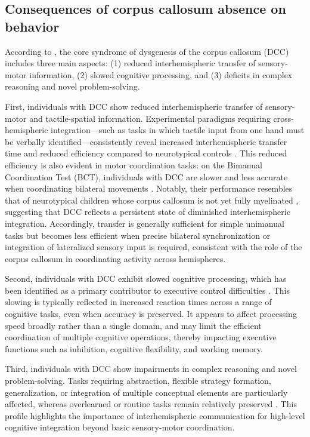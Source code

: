 \documentclass{article}
\begin{document}
\subsection{Consequences of corpus callosum absence on behavior}

According to \citet{Brown2019}, the core syndrome of dysgenesis of the corpus callosum (DCC) includes three main aspects: (1) reduced interhemispheric transfer of sensory-motor information, (2) slowed cognitive processing, and (3) deficits in complex reasoning and novel problem-solving.

First, individuals with DCC show reduced interhemispheric transfer of sensory-motor and tactile-spatial information. Experimental paradigms requiring cross-hemispheric integration—such as tasks in which tactile input from one hand must be verbally identified—consistently reveal increased interhemispheric transfer time and reduced efficiency compared to neurotypical controls \citep{Brown1999,Paul2007}. This reduced efficiency is also evident in motor coordination tasks: on the Bimanual Coordination Test (BCT), individuals with DCC are slower and less accurate when coordinating bilateral movements \citep{Mueller2009}. Notably, their performance resembles that of neurotypical children whose corpus callosum is not yet fully myelinated \citep{Marion2003}, suggesting that DCC reflects a persistent state of diminished interhemispheric integration. Accordingly, transfer is generally sufficient for simple unimanual tasks but becomes less efficient when precise bilateral synchronization or integration of lateralized sensory input is required, consistent with the role of the corpus callosum in coordinating activity across hemispheres.

Second, individuals with DCC exhibit slowed cognitive processing, which has been identified as a primary contributor to executive control difficulties \citep{Brown2019,Marco2012}. This slowing is typically reflected in increased reaction times across a range of cognitive tasks, even when accuracy is preserved. It appears to affect processing speed broadly rather than a single domain, and may limit the efficient coordination of multiple cognitive operations, thereby impacting executive functions such as inhibition, cognitive flexibility, and working memory.

Third, individuals with DCC show impairments in complex reasoning and novel problem-solving. Tasks requiring abstraction, flexible strategy formation, generalization, or integration of multiple conceptual elements are particularly affected, whereas overlearned or routine tasks remain relatively preserved \citep{Brown2019,Erickson2013,Cherbuin2005}. This profile highlights the importance of interhemispheric communication for high-level cognitive integration beyond basic sensory-motor coordination.
\end{document}

